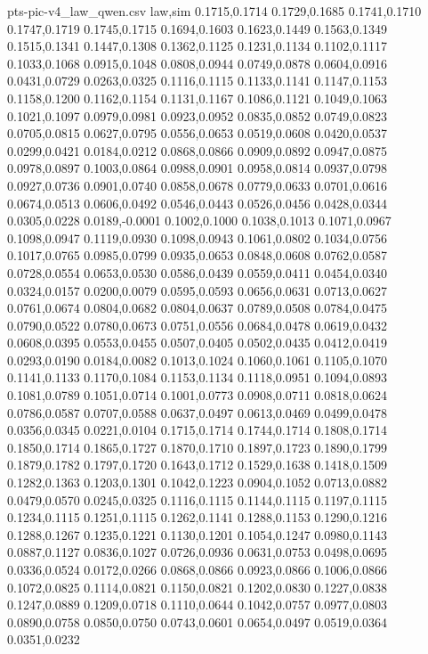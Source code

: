 \begin{filecontents*}[overwrite]{pts-pic-v4_law_qwen.csv}
law,sim
0.1715,0.1714
0.1729,0.1685
0.1741,0.1710
0.1747,0.1719
0.1745,0.1715
0.1694,0.1603
0.1623,0.1449
0.1563,0.1349
0.1515,0.1341
0.1447,0.1308
0.1362,0.1125
0.1231,0.1134
0.1102,0.1117
0.1033,0.1068
0.0915,0.1048
0.0808,0.0944
0.0749,0.0878
0.0604,0.0916
0.0431,0.0729
0.0263,0.0325
0.1116,0.1115
0.1133,0.1141
0.1147,0.1153
0.1158,0.1200
0.1162,0.1154
0.1131,0.1167
0.1086,0.1121
0.1049,0.1063
0.1021,0.1097
0.0979,0.0981
0.0923,0.0952
0.0835,0.0852
0.0749,0.0823
0.0705,0.0815
0.0627,0.0795
0.0556,0.0653
0.0519,0.0608
0.0420,0.0537
0.0299,0.0421
0.0184,0.0212
0.0868,0.0866
0.0909,0.0892
0.0947,0.0875
0.0978,0.0897
0.1003,0.0864
0.0988,0.0901
0.0958,0.0814
0.0937,0.0798
0.0927,0.0736
0.0901,0.0740
0.0858,0.0678
0.0779,0.0633
0.0701,0.0616
0.0674,0.0513
0.0606,0.0492
0.0546,0.0443
0.0526,0.0456
0.0428,0.0344
0.0305,0.0228
0.0189,-0.0001
0.1002,0.1000
0.1038,0.1013
0.1071,0.0967
0.1098,0.0947
0.1119,0.0930
0.1098,0.0943
0.1061,0.0802
0.1034,0.0756
0.1017,0.0765
0.0985,0.0799
0.0935,0.0653
0.0848,0.0608
0.0762,0.0587
0.0728,0.0554
0.0653,0.0530
0.0586,0.0439
0.0559,0.0411
0.0454,0.0340
0.0324,0.0157
0.0200,0.0079
0.0595,0.0593
0.0656,0.0631
0.0713,0.0627
0.0761,0.0674
0.0804,0.0682
0.0804,0.0637
0.0789,0.0508
0.0784,0.0475
0.0790,0.0522
0.0780,0.0673
0.0751,0.0556
0.0684,0.0478
0.0619,0.0432
0.0608,0.0395
0.0553,0.0455
0.0507,0.0405
0.0502,0.0435
0.0412,0.0419
0.0293,0.0190
0.0184,0.0082
0.1013,0.1024
0.1060,0.1061
0.1105,0.1070
0.1141,0.1133
0.1170,0.1084
0.1153,0.1134
0.1118,0.0951
0.1094,0.0893
0.1081,0.0789
0.1051,0.0714
0.1001,0.0773
0.0908,0.0711
0.0818,0.0624
0.0786,0.0587
0.0707,0.0588
0.0637,0.0497
0.0613,0.0469
0.0499,0.0478
0.0356,0.0345
0.0221,0.0104
0.1715,0.1714
0.1744,0.1714
0.1808,0.1714
0.1850,0.1714
0.1865,0.1727
0.1870,0.1710
0.1897,0.1723
0.1890,0.1799
0.1879,0.1782
0.1797,0.1720
0.1643,0.1712
0.1529,0.1638
0.1418,0.1509
0.1282,0.1363
0.1203,0.1301
0.1042,0.1223
0.0904,0.1052
0.0713,0.0882
0.0479,0.0570
0.0245,0.0325
0.1116,0.1115
0.1144,0.1115
0.1197,0.1115
0.1234,0.1115
0.1251,0.1115
0.1262,0.1141
0.1288,0.1153
0.1290,0.1216
0.1288,0.1267
0.1235,0.1221
0.1130,0.1201
0.1054,0.1247
0.0980,0.1143
0.0887,0.1127
0.0836,0.1027
0.0726,0.0936
0.0631,0.0753
0.0498,0.0695
0.0336,0.0524
0.0172,0.0266
0.0868,0.0866
0.0923,0.0866
0.1006,0.0866
0.1072,0.0825
0.1114,0.0821
0.1150,0.0821
0.1202,0.0830
0.1227,0.0838
0.1247,0.0889
0.1209,0.0718
0.1110,0.0644
0.1042,0.0757
0.0977,0.0803
0.0890,0.0758
0.0850,0.0750
0.0743,0.0601
0.0654,0.0497
0.0519,0.0364
0.0351,0.0232

\end{filecontents*}
